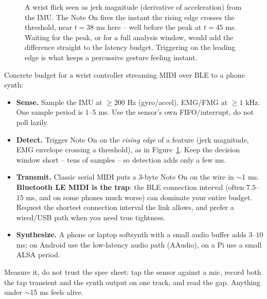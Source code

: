 \begin{figure}[H]
\centering
{}
\caption{A wrist flick seen as jerk magnitude (derivative of acceleration) from the IMU. The Note On
fires the instant the rising edge crosses the threshold, near $t=38$ ms here -- well before the peak at
$t=45$ ms. Waiting for the peak, or for a full analysis window, would add the difference straight to
the latency budget. Triggering on the leading edge is what keeps a percussive gesture feeling
instant.}
\label{ch29:fig-onset}
\end{figure}

\begin{buildbox}
Concrete budget for a wrist controller streaming MIDI over BLE to a phone synth:
\begin{itemize}
  \item \textbf{Sense.} Sample the IMU at $\ge 200$ Hz (gyro/accel), EMG/FMG at $\ge 1$ kHz. One
    sample period is $1$--$5$ ms. Use the sensor's own FIFO/interrupt, do not poll lazily.
  \item \textbf{Detect.} Trigger Note On on the \emph{rising edge} of a feature (jerk magnitude, EMG
    envelope crossing a threshold), as in Figure~\ref{ch29:fig-onset}. Keep the decision window
    short -- tens of samples -- so detection adds only a few ms.
  \item \textbf{Transmit.} Classic serial MIDI puts a $3$-byte Note On on the wire in $\sim$1 ms.
    \textbf{Bluetooth LE MIDI is the trap}: the BLE connection interval (often $7.5$--$15$ ms, and on
    some phones much worse) can dominate your entire budget. Request the shortest connection interval
    the link allows, and prefer a wired/USB path when you need true tightness.
  \item \textbf{Synthesize.} A phone or laptop softsynth with a small audio buffer adds $3$--$10$ ms;
    on Android use the low-latency audio path (AAudio), on a Pi use a small ALSA period.
\end{itemize}
Measure it, do not trust the spec sheet: tap the sensor against a mic, record both the tap transient
and the synth output on one track, and read the gap. Anything under $\sim$15 ms feels alive.
\end{buildbox}

